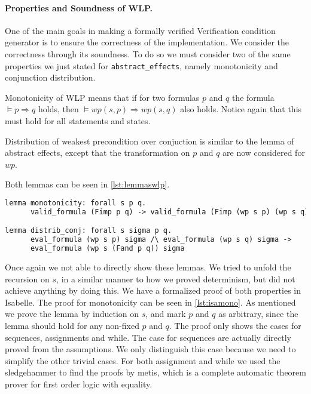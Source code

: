 \paragraph{Properties and Soundness of WLP.}
One of the main goals in making a formally verified Verification condition generator is to ensure the correctness of the implementation.
We consider the correctness through its soundness.
To do so we must consider two of the same properties we just stated for \texttt{abstract\_effects}, namely monotonicity and conjunction distribution.

Monotonicity of WLP means that if for two formulas $p$ and $q$ the formula $\vDash p \Rightarrow q$ holds, then $\vDash wp(s, p) \Rightarrow wp(s,q)$ also holds.
Notice again that this must hold for all statements and states.

Distribution of weakest precondition over conjuction is similar to the lemma of abstract effects, except that the transformation on $p$ and $q$ are now considered for $wp$.

Both lemmas can be seen in \autoref{lst:lemmaswlp}.

\begin{lstlisting}[caption={Lemmas for stating monotonicity and distribution over conjunction for wlp},label={lst:lemmaswlp},language=sml]
lemma monotonicity: forall s p q.
      valid_formula (Fimp p q) -> valid_formula (Fimp (wp s p) (wp s q))

lemma distrib_conj: forall s sigma p q.
      eval_formula (wp s p) sigma /\ eval_formula (wp s q) sigma ->
      eval_formula (wp s (Fand p q)) sigma
\end{lstlisting}

Once again we not able to directly show these lemmas.
We tried to unfold the recursion on $s$, in a similar manner to how we proved determinism, but
 did not achieve anything by doing this.
We have a formalized proof of both properties in Isabelle.
The proof for monotonicity can be seen in \autoref{lst:isamono}.
As mentioned we prove the lemma by induction on $s$,
and mark $p$ and $q$ as arbitrary, since the lemma should hold for any non-fixed $p$ and $q$.
The proof only shows the cases for sequences, assignments and while.
The case for sequences are actually directly proved from the assumptions.
We only distinguish this case because we need to simplify the other trivial cases.
For both assignment and while we used the sledgehammer to find the proofs by metis,
which is a complete automatic theorem prover for first order logic with equality\cite{TODO sledgehammer paper}.

